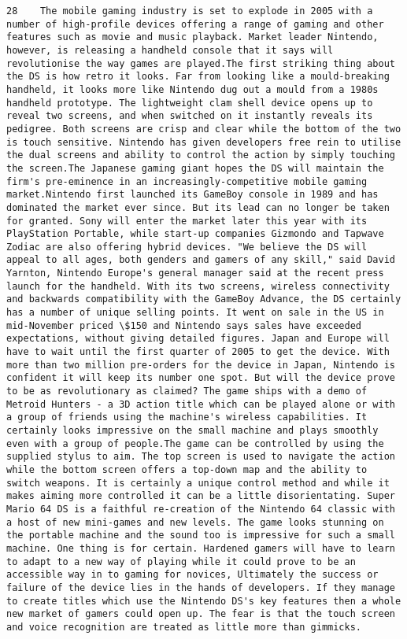 \documentclass[11pt]{article}
\begin{document}
\begin{Verbatim}[commandchars=\\\{\}]
         28    The mobile gaming industry is set to explode in 2005 with a number of high-profile devices offering a range of gaming and other features such as movie and music playback. Market leader Nintendo, however, is releasing a handheld console that it says will revolutionise the way games are played.The first striking thing about the DS is how retro it looks. Far from looking like a mould-breaking handheld, it looks more like Nintendo dug out a mould from a 1980s handheld prototype. The lightweight clam shell device opens up to reveal two screens, and when switched on it instantly reveals its pedigree. Both screens are crisp and clear while the bottom of the two is touch sensitive. Nintendo has given developers free rein to utilise the dual screens and ability to control the action by simply touching the screen.The Japanese gaming giant hopes the DS will maintain the firm's pre-eminence in an increasingly-competitive mobile gaming market.Nintendo first launched its GameBoy console in 1989 and has dominated the market ever since. But its lead can no longer be taken for granted. Sony will enter the market later this year with its PlayStation Portable, while start-up companies Gizmondo and Tapwave Zodiac are also offering hybrid devices. "We believe the DS will appeal to all ages, both genders and gamers of any skill," said David Yarnton, Nintendo Europe's general manager said at the recent press launch for the handheld. With its two screens, wireless connectivity and backwards compatibility with the GameBoy Advance, the DS certainly has a number of unique selling points. It went on sale in the US in mid-November priced \$150 and Nintendo says sales have exceeded expectations, without giving detailed figures. Japan and Europe will have to wait until the first quarter of 2005 to get the device. With more than two million pre-orders for the device in Japan, Nintendo is confident it will keep its number one spot. But will the device prove to be as revolutionary as claimed? The game ships with a demo of Metroid Hunters - a 3D action title which can be played alone or with a group of friends using the machine's wireless capabilities. It certainly looks impressive on the small machine and plays smoothly even with a group of people.The game can be controlled by using the supplied stylus to aim. The top screen is used to navigate the action while the bottom screen offers a top-down map and the ability to switch weapons. It is certainly a unique control method and while it makes aiming more controlled it can be a little disorientating. Super Mario 64 DS is a faithful re-creation of the Nintendo 64 classic with a host of new mini-games and new levels. The game looks stunning on the portable machine and the sound too is impressive for such a small machine. One thing is for certain. Hardened gamers will have to learn to adapt to a new way of playing while it could prove to be an accessible way in to gaming for novices, Ultimately the success or failure of the device lies in the hands of developers. If they manage to create titles which use the Nintendo DS's key features then a whole new market of gamers could open up. The fear is that the touch screen and voice recognition are treated as little more than gimmicks.                                 
\end{Verbatim}
\end{document}
